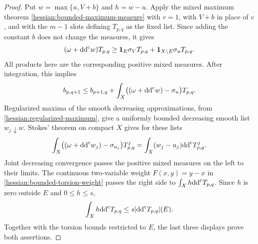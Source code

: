 \begin{proof}
Put $w=\max\{u,V+b\}$ and $h=w-u$.
Apply the mixed maximum theorem \cref{hessian:bounded-maximum-measure}
with $r=1$, with $V+b$ in place of $v$, and with the $m-1$ slots
defining $T_{p,q}$ as the fixed list. Since adding the constant $b$
does not change the measures, it gives
\[
 (\omega+\mathrm{dd}^{\mathrm{c}} w)T_{p,q}
 \geq\mathbf1_E\sigma_VT_{p,q}
                +\mathbf1_{X\setminus E}\sigma_uT_{p,q}.
\]
All products here are the corresponding positive mixed measures.
After integration, this implies
\[
 b_{p,q+1}\leq b_{p+1,q}
       +\int_X\bigl((\omega+\mathrm{dd}^{\mathrm{c}} w)-\sigma_u\bigr)T_{p,q}.
\]
Regularized maxima of the smooth decreasing approximations, from
\cref{hessian:regularized-maximum}, give a uniformly bounded
decreasing smooth list $w_j\downarrow w$.
Stokes' theorem on compact $X$ gives for these lists
\[
 \int_X\bigl((\omega+\mathrm{dd}^{\mathrm{c}} w_j)-\sigma_{u_j}\bigr)T_{p,q}^j
                      =\int_X(w_j-u_j)\mathrm{dd}^{\mathrm{c}} T_{p,q}^j.
\]
Joint decreasing convergence passes the positive mixed measures
on the left to their limits. The continuous two-variable weight
$F(x,y)=y-x$ in \cref{hessian:bounded-torsion-weight} passes the
right side to $\int_Xh\mathrm{dd}^{\mathrm{c}} T_{p,q}$. Since $h$ is zero outside $E$ and $0\leq h\leq s$,
\[
 \int_Xh\mathrm{dd}^{\mathrm{c}} T_{p,q}\leq s|\mathrm{dd}^{\mathrm{c}} T_{p,q}|(E).
\]
Together with the torsion bounds restricted to $E$, the last three
displays prove both assertions.
\end{proof}

